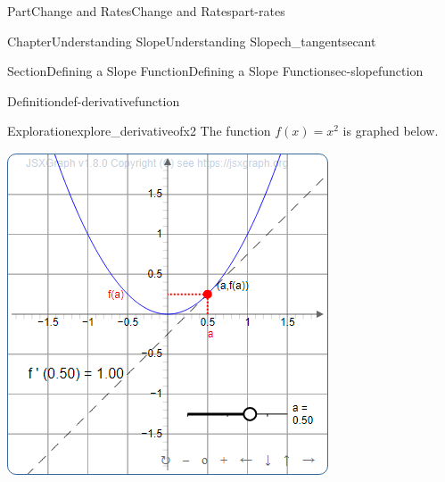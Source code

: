 \documentclass[oneside,10pt,]{tufte-book}
\numberwithin{equation}{chapter}
\begin{document}
\begin{partptx}{Part}{Change and Rates}{}{Change and Rates}{}{}{part-rates}
\begin{chapterptx}{Chapter}{Understanding Slope}{}{Understanding Slope}{}{}{ch_tangentsecant}
\begin{sectionptx}{Section}{Defining a Slope Function}{}{Defining a Slope Function}{}{}{sec-slopefunction}
\begin{definition}{Definition}{}{def-derivativefunction}
\end{definition}
\begin{exploration}{Exploration}{}{explore_derivativeofx2}%
The function \(f(x) = x^2\) is graphed below. \begin{sidebyside}{2}{0.075}{0.075}{0.17}%
\begin{sbspanel}{0.47}%
\includegraphics[width=\linewidth]{generated/preview/explore_derivativeofx2-1-1-2-preview.png}
\end{sbspanel}%
\begin{sbspanel}{0.21}%

\end{sbspanel}
\end{sidebyside}
\end{exploration}
\end{sectionptx}
\end{chapterptx}
\end{partptx}
\end{document}
